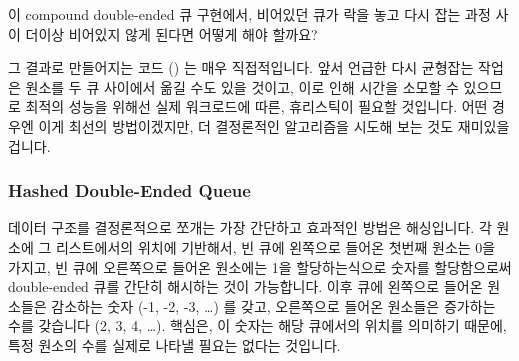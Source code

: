 \QuickQuiz{}
	이 compound double-ended 큐 구현에서, 비어있던 큐가 락을 놓고 다시 잡는
	과정 사이 더이상 비어있지 않게 된다면 어떻게 해야 할까요?

\QuickQuizAnswer{
	이 경우, 그냥 더이상 비어있지 않은 그 큐의 원소를 디큐하고, 락들을
	풀고, 리턴하면 그만입니다.

} \QuickQuizEnd

그 결과로 만들어지는 코드 () 는 매우 직접적입니다.
앞서 언급한 다시 균형잡는 작업은 원소를 두 큐 사이에서 옮길 수도 있을 것이고,
이로 인해 시간을 소모할 수 있으므로 최적의 성능을 위해선 실제 워크로드에 따른,
휴리스틱이 필요할 것입니다.
어떤 경우엔 이게 최선의 방법이겠지만, 더 결정론적인 알고리즘을 시도해 보는 것도
재미있을 겁니다.

\subsubsection{Hashed Double-Ended Queue}
\label{sec:SMPdesign:Hashed Double-Ended Queue}

데이터 구조를 결정론적으로 쪼개는 가장 간단하고 효과적인 방법은 해싱입니다.
각 원소에 그 리스트에서의 위치에 기반해서, 빈 큐에 왼쪽으로 들어온 첫번째
원소는 0을 가지고, 빈 큐에 오른쪽으로 들어온 원소에는 1을 할당하는식으로 숫자를
할당함으로써 double-ended 큐를 간단히 해시하는 것이 가능합니다.
이후 큐에 왼쪽으로 들어온 원소들은 감소하는 숫자 (-1, -2, -3, \ldots) 를 갖고,
오른쪽으로 들어온 원소들은 증가하는 수를 갖습니다 (2, 3, 4, \ldots).
핵심은, 이 숫자는 해당 큐에서의 위치를 의미하기 때문에, 특정 원소의 수를 실제로
나타낼 필요는 없다는 것입니다.

